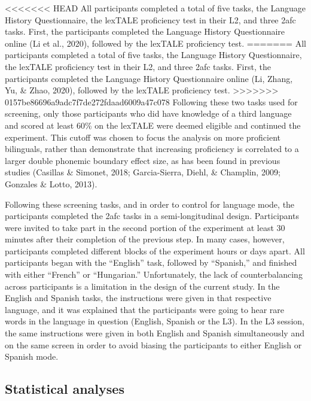 \documentclass[
  english,
  man]{apa6}
\begin{document}
<<<<<<< HEAD
All participants completed a total of five tasks, the Language History Questionnaire, the lexTALE proficiency test in their L2, and three 2afc tasks. First, the participants completed the Language History Questionnaire online (Li et al., 2020), followed by the lexTALE proficiency test.
=======
All participants completed a total of five tasks, the Language History Questionnaire, the lexTALE proficiency test in their L2, and three 2afc tasks. First, the participants completed the Language History Questionnaire online (Li, Zhang, Yu, \& Zhao, 2020), followed by the lexTALE proficiency test.
>>>>>>> 0157be86696a9adc7f7de272fdaad6009a47c078
Following these two tasks used for screening, only those participants who did have knowledge of a third language and scored at least 60\% on the lexTALE were deemed eligible and continued the experiment. This cutoff was chosen to focus the analysis on more proficient bilinguals, rather than demonstrate that increasing proficiency is correlated to a larger double phonemic boundary effect size, as has been found in previous studies (Casillas \& Simonet, 2018; Garcia-Sierra, Diehl, \& Champlin, 2009; Gonzales \& Lotto, 2013).

Following these screening tasks, and in order to control for language mode, the participants completed the 2afc tasks in a semi-longitudinal design.
Participants were invited to take part in the second portion of the experiment at least 30 minutes after their completion of the previous step. In many cases, however, participants completed different blocks of the experiment hours or days apart.
All participants began with the ``English'' task, followed by ``Spanish,'' and finished with either ``French'' or ``Hungarian.'' Unfortunately, the lack of counterbalancing across participants is a limitation in the design of the current study.
In the English and Spanish tasks, the instructions were given in that respective language, and it was explained that the participants were going to hear rare words in the language in question (English, Spanish or the L3).
In the L3 session, the same instructions were given in both English and Spanish simultaneously and on the same screen in order to avoid biasing the participants to either English or Spanish mode.

\hypertarget{statistical-analyses}{%
\subsection{Statistical analyses}\label{statistical-analyses}}
\end{document}
